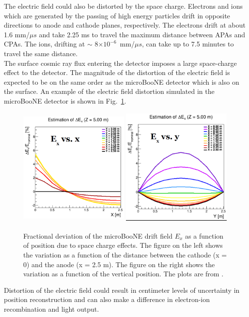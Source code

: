 The electric field could also be distorted by the space charge.  Electrons and ions which are generated by the passing of high energy particles drift in opposite directions to anode and cathode planes, respectively. The electrons drift at about 1.6 mm/$\mu s$ and take 2.25 ms to travel the maximum distance between APAs and CPAs. The ions, drifting at $\sim$ 8$\times 10^{-6}$~mm/$\mu s$, can take up to 7.5 minutes to travel the same distance. \\
The surface cosmic ray flux entering the detector imposes a large space-charge effect to the detector.  The magnitude of the distortion of the electric field is expected to be on the same order as the microBooNE detector which is also on the surface.  An example of the electric field distortion simulated in the microBooNE detector is shown in Fig.~\ref{fig:space_charge}.
\begin{figure}[h!]
  \centering
\includegraphics[width=0.49\textwidth,height=6.0cm]{figures/spacechargeEvsx} 
\includegraphics[width=0.49\textwidth,height=6.0cm]{figures/spacechargeEvsy} 
  \caption{Fractional deviation of the microBooNE drift field $E_{x}$ as a function of position due to space charge effects.  The figure on the left shows the variation as a function of the distance between the cathode (x = 0) and the anode (x = 2.5 m).  The figure on the right shows the variation as a function of the vertical position.  The plots are from \cite{ref:space_charge}.
}
\label{fig:space_charge}
\end{figure}
Distortion of the electric field could result in centimeter levels of uncertainty in position reconstruction and can also make a difference in electron-ion recombination and light output. 


